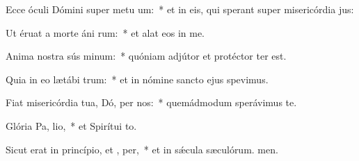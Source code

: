 \item Ecce óculi Dómini super metu um:~* et in eis, qui sperant super misericórdia jus:
\item Ut éruat a morte áni rum:~* et alat eos in me.
\item Anima nostra sús minum:~* quóniam adjútor et protéctor ter est.
\item Quia in eo lætábi  trum:~* et in nómine sancto ejus spevimus.
\item Fiat misericórdia tua, Dó, per nos:~* quemádmodum sperávimus  te.
\item Glória Pa,  lio,~* et Spirítui to.
\item Sicut erat in princípio, et ,  per,~* et in sǽcula sæculórum. men.
